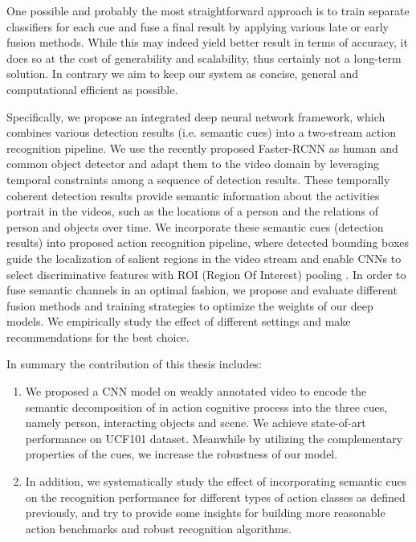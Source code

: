 One possible and probably the most straightforward approach is to train separate classifiers for each cue and fuse a final result by applying various late or early fusion methods. 
While this may indeed yield better result in terms of accuracy, it does so at the cost of generability and scalability, thus certainly not a long-term solution. 
In contrary we aim to keep our system as concise, general and computational efficient as possible.

Specifically, we propose an integrated deep neural network framework, which combines various detection results (i.e. semantic cues) into a two-stream action recognition pipeline. 
We use the recently proposed Faster-RCNN \cite{ren2015faster} as human and common object detector and adapt them to the video domain by leveraging temporal constraints among a sequence of detection results.
These temporally coherent detection results provide semantic information about the activities portrait in the videos, such as the locations of a person and the relations of person and objects over time. 
We incorporate these semantic cues (detection results) into proposed action recognition pipeline, where detected bounding boxes guide the localization of salient regions in the video stream and enable CNNs to select discriminative features with ROI (Region Of Interest) pooling \cite{girshick2015fast}. 
In order to fuse semantic channels in an optimal fashion, we propose and evaluate different fusion methods and training strategies to optimize the weights of our deep models.
We empirically study the effect of different settings and make recommendations for the best choice.

In summary the contribution of this thesis includes:
\begin{enumerate}
	\item We proposed a CNN model on weakly annotated video to encode the semantic decomposition of in action cognitive process into the three cues, namely person, interacting objects and scene. We achieve state-of-art performance on UCF101 dataset. Meanwhile by utilizing the complementary properties of the cues, we increase the robustness of our model.
	\item In addition, we systematically study the effect of incorporating semantic cues on the recognition performance for different types of action classes as defined previously, and try to provide some insights for building more reasonable action benchmarks and robust recognition algorithms.
\end{enumerate}

